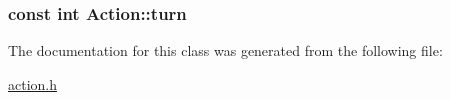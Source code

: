 \hypertarget{classAction_51e5d56a6aa4a037e90df19587a225c7}{
\subsubsection[{turn}]{\setlength{\rightskip}{0pt plus 5cm}const int {\bf Action::turn}}}
\label{classAction_51e5d56a6aa4a037e90df19587a225c7}




The documentation for this class was generated from the following file:\begin{CompactItemize}
\item 
\hyperlink{action_8h}{action.h}\end{CompactItemize}
